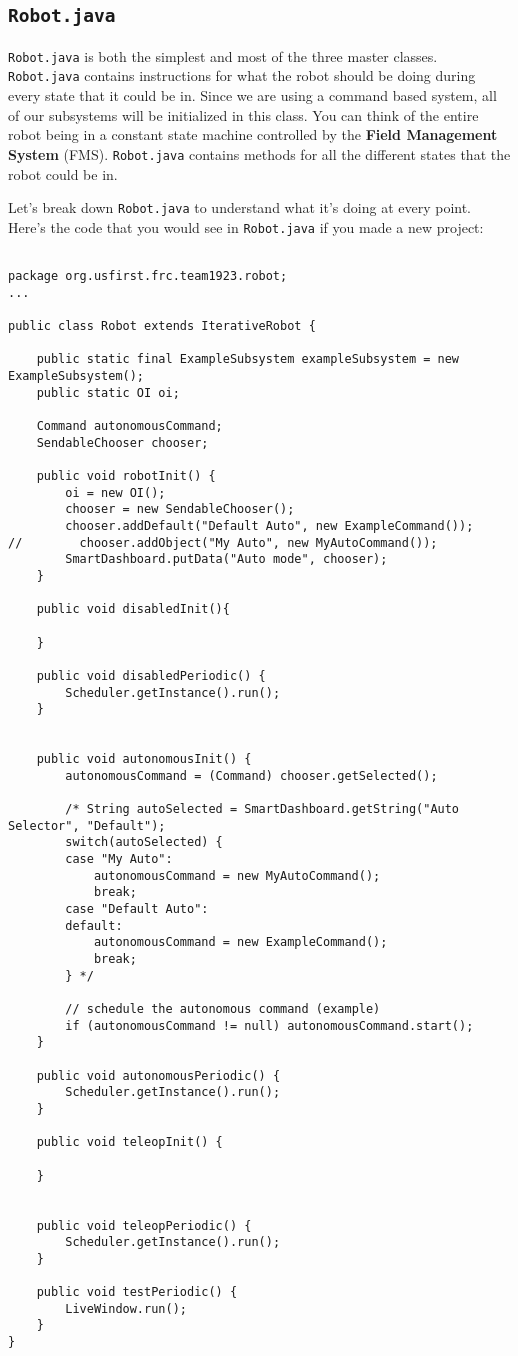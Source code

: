 \documentclass[11pt,fleqn]{article}
\begin{document}
\subsection{\texttt{Robot.java}}

\texttt{Robot.java} is both the simplest and most of the three master classes. \texttt{Robot.java} contains
instructions for what the robot should be doing during every state that it could be in. Since we are using
a command based system, all of our subsystems will be initialized in this class. You can think of the
entire robot being in a constant state machine controlled by the \textbf{Field Management System} (FMS).
\texttt{Robot.java} contains methods for all the different states that the robot could be in. 


Let's break down \texttt{Robot.java} to understand what it's doing at every point. Here's the code that
you would see in \texttt{Robot.java} if you made a new project: 

\begin{verbatim}

package org.usfirst.frc.team1923.robot;
...

public class Robot extends IterativeRobot {

	public static final ExampleSubsystem exampleSubsystem = new ExampleSubsystem(); 
	public static OI oi;

    Command autonomousCommand;
    SendableChooser chooser;

    public void robotInit() {
		oi = new OI();
        chooser = new SendableChooser();
        chooser.addDefault("Default Auto", new ExampleCommand());
//        chooser.addObject("My Auto", new MyAutoCommand());
        SmartDashboard.putData("Auto mode", chooser);
    }
	
    public void disabledInit(){

    }
	
    public void disabledPeriodic() {
		Scheduler.getInstance().run();
    }


    public void autonomousInit() {
        autonomousCommand = (Command) chooser.getSelected();
        
		/* String autoSelected = SmartDashboard.getString("Auto Selector", "Default");
		switch(autoSelected) {
		case "My Auto":
			autonomousCommand = new MyAutoCommand();
			break;
		case "Default Auto":
		default:
			autonomousCommand = new ExampleCommand();
			break;
		} */
    	
    	// schedule the autonomous command (example)
        if (autonomousCommand != null) autonomousCommand.start();
    }

    public void autonomousPeriodic() {
        Scheduler.getInstance().run();
    }

    public void teleopInit() {
		
    }


    public void teleopPeriodic() {
        Scheduler.getInstance().run();
    }
    
    public void testPeriodic() {
        LiveWindow.run();
    }
}
\end{verbatim}
\end{document}
